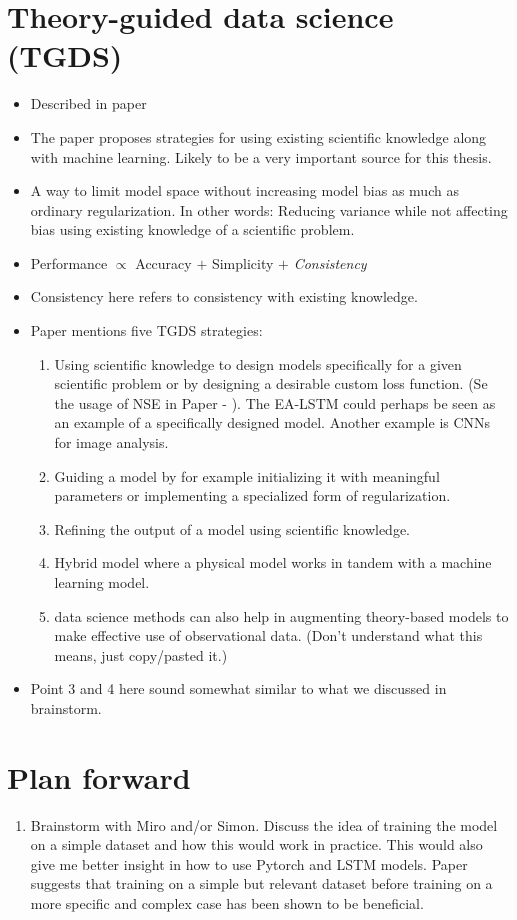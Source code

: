 \documentclass[a4paper,12pt,english]{article}
\begin{document}
\section*{Theory-guided data science (TGDS)}
\begin{itemize}
\item Described in paper \cite{hybrid_paper}
\item The paper proposes strategies for using existing scientific knowledge along with machine learning. Likely to be a very important source for this thesis.
\item A way to limit model space without increasing model bias as much as ordinary regularization. In other words: Reducing variance while not affecting bias using existing knowledge of a scientific problem.
\item Performance $\propto$ Accuracy $+$ Simplicity $+$ \textit{Consistency}
\item Consistency here refers to consistency with existing knowledge.
\item Paper mentions five TGDS strategies:
\begin{enumerate}
\item Using scientific knowledge to design models specifically for a given scientific problem or by designing a desirable custom loss function. (Se the usage of NSE in Paper \cite{lstm_first_paper} - \cite{lstm_third_paper}). The EA-LSTM could perhaps be seen as an example of a specifically designed model. Another example is CNNs for image analysis.
\item Guiding a model by for example initializing it with meaningful parameters or implementing a specialized form of regularization.
\item Refining the output of a model using scientific knowledge.
\item Hybrid model where a physical model works in tandem with a machine learning model. 
\item data science methods can also help in augmenting theory-based models to make effective use of observational data. (Don't understand what this means, just copy/pasted it.)
\end{enumerate}
\item Point 3 and 4 here sound somewhat similar to what we discussed in brainstorm.
\end{itemize}

\section*{Plan forward}
\begin{enumerate}
\item Brainstorm with Miro and/or Simon. Discuss the idea of training the model on a simple dataset and how this would work in practice. This would also give me better insight in how to use Pytorch and LSTM models. Paper \cite{hybrid_paper} suggests that training on a simple but relevant dataset before training on a more specific and complex case has been shown to be beneficial.
\end{enumerate}



\end{document}
